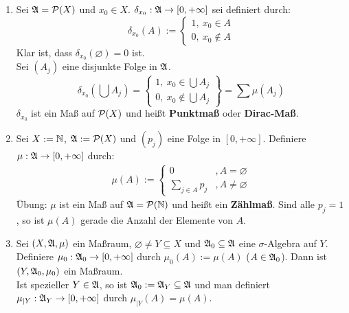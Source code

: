 \documentclass[a4paper,twoside,DIV15,BCOR12mm,chapterprefix=true,headings=onelinechapter]{scrbook}
\begin{document}
\begin{beispiel}
\begin{enumerate}
\item Sei $\mathfrak{A}=\mathcal{P}(X)$ und $x_0\in X$. $\delta_{x_0}:\mathfrak{A}\to[0,+\infty]$ sei definiert durch:
\[\delta_{x_0}(A):=
\begin{cases}
1,\ x_0\in A\\
0,\ x_0\not\in A
\end{cases}\]
Klar ist, dass $\delta_{x_0}(\varnothing)=0$ ist.\\
Sei $(A_j)$ eine disjunkte Folge in $\mathfrak{A}$.
\[\delta_{x_0}(\bigcup A_j)=
\left.\begin{cases}
1,\ x_0\in\bigcup A_j\\
0,\ x_0\not\in\bigcup A_j
\end{cases}\right\}=\sum\mu(A_j)\]
$\delta_{x_0}$ ist ein Maß auf $\mathcal{P}(X)$ und heißt \textbf{Punktmaß} oder \textbf{Dirac-Maß}.
\item Sei $X:=\mathbb{N}$, $\mathfrak{A}:=\mathcal{P}(X)$ und $(p_j)$ eine Folge in $[0,+\infty]$. Definiere $\mu:\mathfrak{A}\to[0,+\infty]$ durch:
\begin{align*}
\mu(A):=
\begin{cases}
0&,A=\varnothing\\
\sum_{j\in A}p_j&,A\ne\varnothing
\end{cases}
\end{align*}
Übung: $\mu$ ist ein Maß auf $\mathfrak{A}=\mathcal{P}(\mathbb{N})$ und heißt ein \textbf{Zählmaß}. Sind alle $p_j=1$, so ist $\mu(A)$ gerade die Anzahl der Elemente von $A$.
\item Sei $(X,\mathfrak{A},\mu)$ ein Maßraum, $\varnothing\ne Y\subseteq X$ und $\mathfrak{A}_0\subseteq\mathfrak{A}$ eine $\sigma$-Algebra auf $Y$. Definiere $\mu_0:\mathfrak{A}_0\to[0,+\infty]$ durch $\mu_0(A):=\mu(A)$ ($A\in\mathfrak{A}_0$). Dann ist $(Y,\mathfrak{A}_0,\mu_0)$ ein Maßraum.\\
Ist spezieller $Y\in\mathfrak{A}$, so ist $\mathfrak{A}_0:=\mathfrak{A}_Y\subseteq\mathfrak{A}$ und man definiert $\mu_{|Y}:\mathfrak{A}_Y\to[0,+\infty]$ durch $\mu_{|Y}(A)=\mu(A)$.
\end{enumerate}
\end{beispiel}
\end{document}
